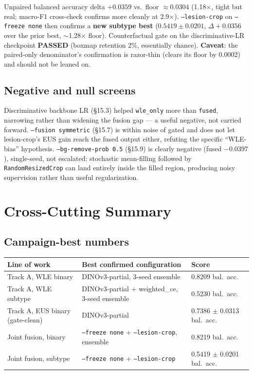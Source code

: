 \documentclass[10pt]{article}
\begin{document}
Unpaired balanced accuracy delta $+0.0359$ vs.\ floor $\approx0.0304$ (1.18$\times$, tight but real; macro-F1
cross-check confirms more cleanly at 2.9$\times$). \texttt{--lesion-crop} on \texttt{--freeze none} then
confirms a \textbf{new subtype best} ($0.5419\pm0.0201$, $\Delta+0.0356$ over the prior best, $\sim$1.28$\times$
floor). Counterfactual gate on the discriminative-LR checkpoint \textbf{PASSED} (boxmap retention 2\%,
essentially chance). \textbf{Caveat}: the paired-only denominator's confirmation is razor-thin (clears its
floor by 0.0002) and should not be leaned on.

\subsection{Negative and null screens}

Discriminative backbone LR (\S15.3) helped \texttt{wle\_only} more than \texttt{fused}, narrowing rather than
widening the fusion gap --- a useful negative, not carried forward. \texttt{--fusion symmetric} (\S15.7) is
within noise of gated and does not let lesion-crop's EUS gain reach the fused output either, refuting the
specific ``WLE-bias'' hypothesis. \texttt{--bg-remove-prob 0.5} (\S15.9) is clearly negative (fused
$-0.0397$), single-seed, not escalated: stochastic mean-filling followed by \texttt{RandomResizedCrop} can
land entirely inside the filled region, producing noisy supervision rather than useful regularization.

\clearpage
\section{Cross-Cutting Summary}
\label{sec:summary}

\subsection{Campaign-best numbers}

\begin{center}
\begin{tabular}{L{4.3cm}L{7.4cm}C{2.6cm}}
\toprule
\textbf{Line of work} & \textbf{Best confirmed configuration} & \textbf{Score} \\
\midrule
Track A, WLE binary & DINOv3-partial, 3-seed ensemble & 0.8209 bal.\ acc. \\
Track A, WLE subtype & DINOv3-partial + weighted\_ce, 3-seed ensemble & 0.5230 bal.\ acc. \\
Track A, EUS binary (gate-clean) & DINOv3-partial & 0.7386 $\pm$ 0.0313 bal.\ acc. \\
Joint fusion, binary & \texttt{--freeze none} + \texttt{--lesion-crop}, ensemble & 0.8219 bal.\ acc. \\
Joint fusion, subtype & \texttt{--freeze none} + \texttt{--lesion-crop} & 0.5419 $\pm$ 0.0201 bal.\ acc. \\
\bottomrule
\end{tabular}
\end{center}
\end{document}
